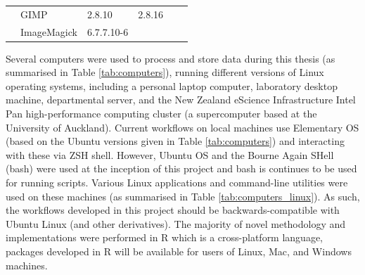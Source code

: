 \begin{table}[!ht]
{\begin{tabular}{ll|l|l|l|l|}
\multicolumn{1}{|l}{}                                  & \multicolumn{1}{|l|}{GIMP}                   & 2.8.10                                                              & 2.8.16                                                            &                                                                        &                                                             \\ \cline{2-6}
\multicolumn{1}{|l}{}                                  & \multicolumn{1}{|l|}{ImageMagick}            & 6.7.7.10-6                                                          &                                                                   &                                                                        &                                                             \\ \hline
                                  
\end{tabular}
}
\end{table}

Several computers were used to process and store data during this thesis (as summarised in Table \ref{tab:computers}), running different versions of Linux operating systems, including a personal laptop computer, laboratory desktop machine, departmental server, and the New Zealand eScience Infrastructure Intel Pan high-performance computing cluster (a supercomputer based at the University of Auckland). Current workflows on local machines use Elementary OS (based on the Ubuntu versions given in Table \ref{tab:computers}) and interacting with these via ZSH shell. However, Ubuntu OS and the Bourne Again SHell (bash) were used at the inception of this project and bash is continues to be used for running scripts. Various Linux applications and command-line utilities were used on these machines (as summarised in Table \ref{tab:computers_linux}). As such, the workflows developed in this project should be backwards-compatible with Ubuntu Linux (and other derivatives). The majority of novel methodology and implementations were performed in R which is a cross-platform language, packages developed in R will be available for users of Linux, Mac, and Windows machines.  


